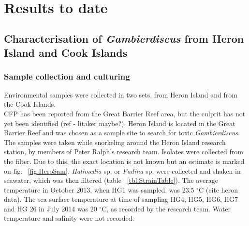 \documentclass[12pt]{article}
\begin{document}
\section{Results to date}

\subsection{Characterisation of \emph{Gambierdiscus} from Heron Island and Cook Islands}

\subsubsection{Sample collection and culturing}
Environmental samples were collected in two sets, from Heron Island and from the Cook Islands.\\

CFP has been reported from the Great Barrier Reef area, but the culprit has not yet been identified (ref - litaker maybe?). Heron Island is located in the Great Barrier Reef and was chosen as a sample site to search for toxic \emph{Gambierdiscus}.\\ 
The samples were taken while snorkeling around the Heron Island research station, by members of Peter Ralph's research team. Isolates were collected from the filter. Due to this, the exact location is not known but an estimate is marked on fig. ~\ref{fig:HeroSam}. \emph{Halimedia} sp. or \emph{Padina} sp. were collected and shaken in seawater, which was then filtered (table ~\ref{tbl:StrainTable}). The average temperature in October 2013, when HG1 was sampled, was 23.5 $^{\circ}$C (cite heron data). The sea surface temperature at time of sampling HG4, HG5, HG6, HG7 and HG 26 in July 2014 was 20 $^{\circ}$C, as recorded by the research team. Water temperature and salinity were not recorded.
\end{document}
